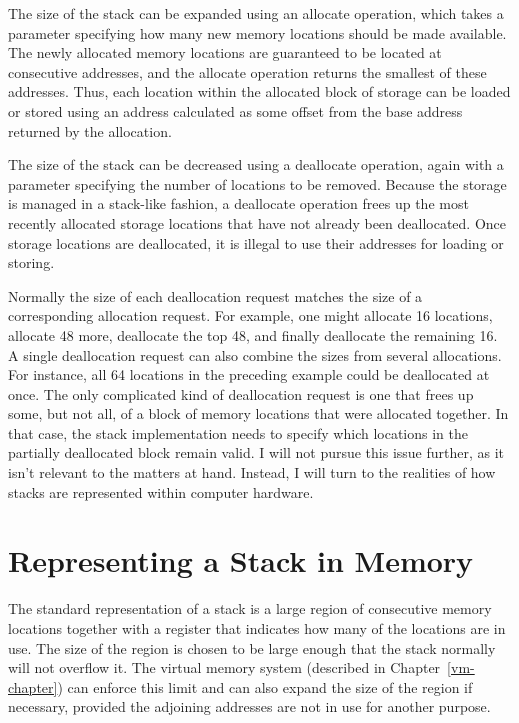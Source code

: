 The size of the stack can be expanded using an allocate operation,
which takes a parameter specifying how many new memory locations
should be made available.  The newly allocated memory locations are
guaranteed to be located at consecutive addresses, and the allocate
operation returns the smallest of these addresses.  Thus, each
location within the allocated block of storage can be loaded or stored
using an address calculated as some offset from the base address
returned by the allocation.

The size of the stack can be decreased using a deallocate operation,
again with a parameter specifying the number of locations to be
removed.  Because the storage is managed in a stack-like fashion, a
deallocate operation frees up the most recently allocated storage
locations that have not already been deallocated.  Once storage
locations are deallocated, it is illegal to use their addresses for
loading or storing.

Normally the size of each deallocation request matches the size of a
corresponding allocation request.  For example, one might allocate 16
locations,  allocate 48 more,  deallocate the top 48, and
finally deallocate the remaining 16.  A single deallocation request can
also combine the sizes from several allocations.  For instance, all 64
locations in the preceding example could be deallocated at once.  The only
complicated kind of deallocation request is one that frees up some, but not
all, of a block of memory locations that were allocated together.  In
that case, the stack implementation needs to specify which locations
in the partially deallocated block remain valid.  I will not pursue
this issue further, as it isn't relevant to the matters at hand.
Instead, I will turn to the realities of how stacks are represented
within computer hardware.

\section{Representing a Stack in Memory}\label{stacks-concrete-section}

The standard representation of a stack is a large region of
consecutive memory locations together with a 
register that indicates how many of the locations are in use.  The
size of the region is chosen to be large enough that the stack normally
will not overflow it.  The virtual memory system (described in
Chapter~\ref{vm-chapter}) can enforce this limit and can also expand
the size of the region if necessary, provided the adjoining addresses
are not in use for another purpose.

